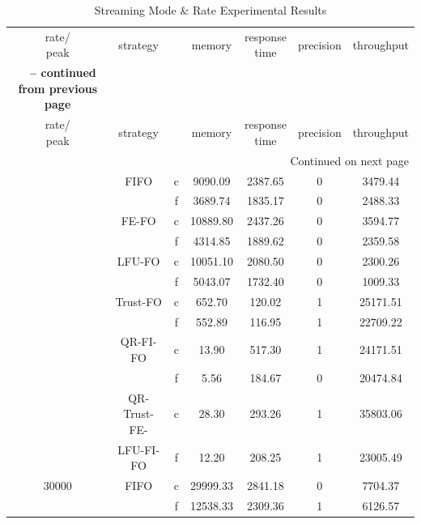 \begin{center}
	\begin{longtable}{|c||c||c|c|c|c|c|}
	\caption[Streaming Mode \& Rate Experimental Results]{Streaming Mode \& Rate Experimental Results} \label{tab:6-smri} \\
	\hline \makecell{rate/ \\ peak} & strategy & \makecell{mode} & memory & \makecell{response \\time} & precision & throughput \\ \hhline{|=#=#=|=|=|=|=|}
	\endfirsthead
	\multicolumn{7}{c} {{\bfseries \tablename\ \thetable{} -- continued from previous page}} \\
	\hline \makecell{rate/ \\ peak} & strategy & \makecell{mode} & memory & \makecell{response \\time} & precision & throughput \\ \hline 
	\endhead
	\hline \multicolumn{7}{|r|}{{Continued on next page}} \\ \hline
	\endfoot
	\hline
	\endlastfoot
	10000 & FIFO & c  & 9090.09 & 2387.65 & 0 & 3479.44 \\ \cline{3-7}
	      &      & f  & 3689.74 & 1835.17 & 0 & 2488.33 \\ \cline{2-7}
	      & FE-FO & c & 10889.80 & 2437.26 & 0 & 3594.77\\ \cline{3-7}
	      &       & f & 4314.85  & 1889.62 & 0 & 2359.58\\ \cline{2-7}
	      & LFU-FO & c & 10051.10 & 2080.50 & 0 & 2300.26 \\ \cline{3-7}
	      &        & f & 5043.07  & 1732.40 & 0 & 1009.33\\  \cline{2-7}
	      & Trust-FO & c & 652.70 & 120.02 & 1 & 25171.51\\  \cline{3-7}
	      &          & f & 552.89 & 116.95 & 1 & 22709.22\\  \cline{2-7}
	      & QR-FI-FO & c & 13.90 & 517.30 & 1 & 24171.51\\ \cline{3-7}
	      &          & f & 5.56  & 184.67 & 0 & 20474.84\\  \cline{2-7}
	      & QR-Trust-FE- & c & 28.30 & 293.26 & 1 & 35803.06\\  \cline{3-7}
	      & LFU-FI-FO    & f & 12.20 & 208.25 & 1 & 23005.49\\ \hhline{|=#=#=|=|=|=|=|}
	30000 & FIFO & c & 29999.33 & 2841.18 & 0 & 7704.37 \\     \cline{3-7}
	      &      & f & 12538.33 & 2309.36 & 1 & 6126.57 \\ \cline{2-7}

\end{longtable}
\end{center}
